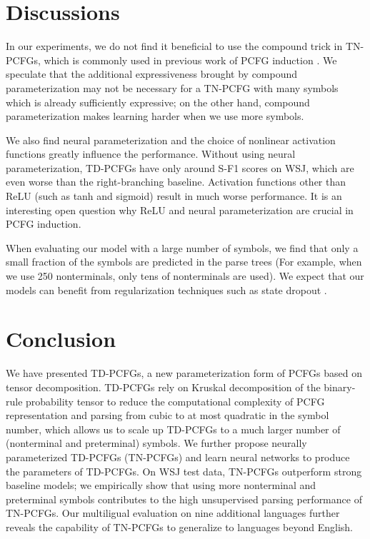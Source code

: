 \documentclass[11pt]{article}
\begin{document}
\section{Discussions}
In our experiments, we do not find it beneficial to use the compound trick \cite{kim-etal-2019-compound} in TN-PCFGs, which is commonly used in previous work of PCFG induction \cite{kim-etal-2019-compound, zhao-titov-2020-visually, zhu2020return}. We speculate that the additional expressiveness brought by compound parameterization may not be necessary for a TN-PCFG with many symbols which is already sufficiently expressive; on the other hand, compound parameterization makes learning harder when we use more symbols. 

We also find neural parameterization and the choice of nonlinear activation functions greatly influence the performance. Without using neural parameterization, TD-PCFGs have only around  S-F1 scores on WSJ, which are even worse than the right-branching baseline. Activation functions other than ReLU (such as tanh and sigmoid) result in much worse performance. It is an interesting open question why ReLU and neural parameterization are crucial in PCFG induction.   

When evaluating our model with a large number of symbols, we find that only a small fraction of the symbols are predicted in the parse trees (For example, when we use 250 nonterminals, only tens of nonterminals are used). We expect that our models can benefit from regularization techniques such as state dropout \cite{chiu-rush-2020-scaling}. 

\section{Conclusion}

We have presented TD-PCFGs, a new parameterization form of PCFGs based on tensor decomposition.
TD-PCFGs rely on Kruskal decomposition of the binary-rule probability tensor to reduce the computational complexity of PCFG representation and parsing from cubic to at most quadratic in the symbol number,
which allows us to scale up TD-PCFGs to a much larger number of (nonterminal and preterminal) symbols.
We further propose neurally parameterized TD-PCFGs (TN-PCFGs) and learn neural networks to produce the parameters of TD-PCFGs.
On WSJ test data, 
TN-PCFGs outperform strong baseline models;
we empirically show that using more nonterminal and preterminal symbols contributes to the high unsupervised parsing performance of TN-PCFGs.
Our multiligual evaluation on nine additional languages 
further reveals the capability of TN-PCFGs to generalize to languages beyond English.
\end{document}
